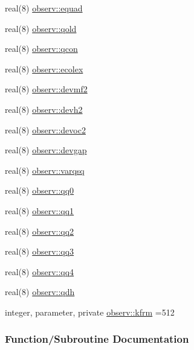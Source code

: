 \begin{DoxyCompactItemize}
\item 
real(8) \hyperlink{namespaceobserv_ab70baa891e5608be4ea8c1a24c762d12}{observ\+::equad}
\item 
real(8) \hyperlink{namespaceobserv_a8aaf442bc6b6a3d7ef38d939c0819e99}{observ\+::qold}
\item 
real(8) \hyperlink{namespaceobserv_a2b56c807c1301829c79e6f061ac78297}{observ\+::qcon}
\item 
real(8) \hyperlink{namespaceobserv_a6331b57c0ae11428cdfa449797aa09d2}{observ\+::ecolex}
\item 
real(8) \hyperlink{namespaceobserv_aca69c157018bf487e453d1813641ba01}{observ\+::devmf2}
\item 
real(8) \hyperlink{namespaceobserv_ae9229ef6dc10115d9fe75d1388132b7d}{observ\+::devh2}
\item 
real(8) \hyperlink{namespaceobserv_a64f340dc1105ba5ed8e16d357001225b}{observ\+::devoc2}
\item 
real(8) \hyperlink{namespaceobserv_a1e0de4a0f835cef78c7b7d41966b0309}{observ\+::devgap}
\item 
real(8) \hyperlink{namespaceobserv_a8c28d244f2e590aebb022ae00f6cb8f6}{observ\+::varqsq}
\item 
real(8) \hyperlink{namespaceobserv_afe768980804ddf6563d50cb7d003c1ab}{observ\+::qq0}
\item 
real(8) \hyperlink{namespaceobserv_ade8d12eb6ca05d5c2a9e15190a438bda}{observ\+::qq1}
\item 
real(8) \hyperlink{namespaceobserv_aded073a456b95a001cacac23177dcf46}{observ\+::qq2}
\item 
real(8) \hyperlink{namespaceobserv_a1672ed9b98a4dab7a167d29620fba100}{observ\+::qq3}
\item 
real(8) \hyperlink{namespaceobserv_a9fc1bb5590ff288f6e8a0e89451cf805}{observ\+::qq4}
\item 
real(8) \hyperlink{namespaceobserv_a5631c0f0849e2ae5860c899e3d8e39aa}{observ\+::qdh}
\item 
integer, parameter, private \hyperlink{namespaceobserv_a644f1914424441bcad6f350dc0fe327c}{observ\+::kfrm} =512
\end{DoxyCompactItemize}


\subsubsection{Function/\+Subroutine Documentation}
